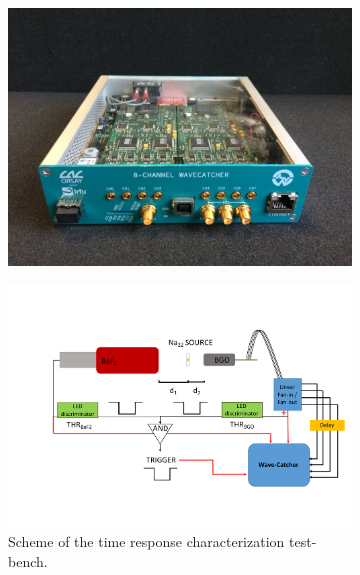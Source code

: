 \begin{figure}
\begin{subfigure}[t]{.45\textwidth}
\centering
\includegraphics[width=1\textwidth]{03_GraphicFiles/chapter3_CLaRySproto/Electronics_Acquisition/WaveCatcher.jpg}
\caption{}
\label{chap3::fig::WaveCatcher}
\end{subfigure}
\begin{subfigure}[t]{.55\textwidth}
\centering
\includegraphics[width=1\textwidth]{03_GraphicFiles/chapter3_CLaRySproto/Absorber/images/coincidence_timing_scheme_complete.pdf}
\caption{Scheme of the time response characterization test-bench.}
\label{chap3::fig::BGOtime_meas_scheme}
\end{subfigure}
\caption{}
\label{chap3::fig::BGO_timingDaq}
\end{figure}

